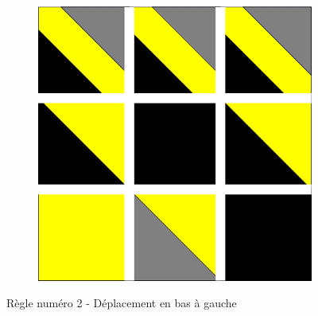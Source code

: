 \documentclass[a4paper]{article}
\begin{document}
\begin{figure}[!h]
\begin{subfigure}[t]{0.17\textwidth}
    \end{subfigure}
    \hfill
    \begin{subfigure}[t]{0.17\textwidth}
        \includegraphics[width=\textwidth]{img/rule21.png}
    \end{subfigure}
    \caption{Règle numéro 2 - Déplacement en bas à gauche}
\end{figure}
\end{document}
